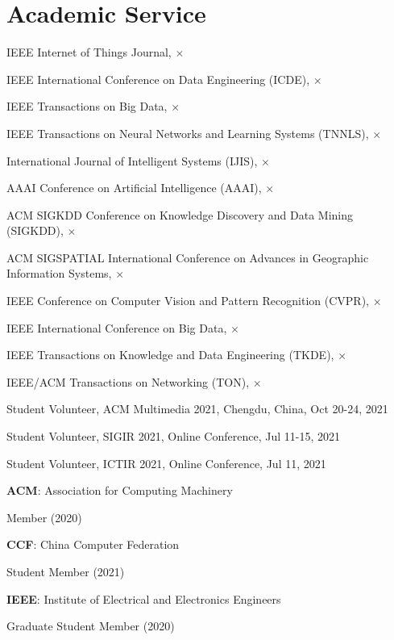 \section*{Academic Service}


\indent

IEEE Internet of Things Journal, $\times$

IEEE International Conference on Data Engineering (ICDE), $\times$

IEEE Transactions on Big Data, $\times$

IEEE Transactions on Neural Networks and Learning Systems (TNNLS), $\times$

International Journal of Intelligent Systems (IJIS), $\times$

AAAI Conference on Artificial Intelligence (AAAI), $\times$

ACM SIGKDD Conference on Knowledge Discovery and Data Mining (SIGKDD), $\times$

ACM SIGSPATIAL International Conference on Advances in Geographic Information Systems, $\times$

IEEE Conference on Computer Vision and Pattern Recognition (CVPR), $\times$

IEEE International Conference on Big Data, $\times$

IEEE Transactions on Knowledge and Data Engineering (TKDE), $\times$

IEEE/ACM Transactions on Networking (TON), $\times$

\indent 

Student Volunteer, ACM Multimedia 2021, Chengdu, China, Oct 20-24, 2021

Student Volunteer, SIGIR 2021, Online Conference, Jul 11-15, 2021

Student Volunteer, ICTIR 2021, Online Conference, Jul 11, 2021

\indent 

\textbf{ACM}: Association for Computing Machinery 

\hspace{2em}Member (2020)

\textbf{CCF}: China Computer Federation

\hspace{2em}Student Member (2021)

\textbf{IEEE}: Institute of Electrical and Electronics Engineers

\hspace{2em}Graduate Student Member (2020)